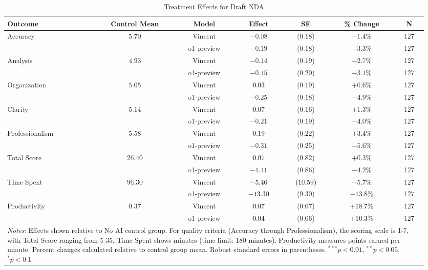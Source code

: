 \begin{table}[!htbp]
\centering
\caption{Treatment Effects for Draft NDA}
\label{tab:task4_effects}
\begin{tabular}{lcccccc}
\hline\hline
Outcome & Control Mean & Model & Effect & SE & \% Change & N \\
\hline
\multirow{2}{*}{Accuracy} & \multirow{2}{*}{$5.70$} & Vincent & $-0.08$ & ($0.18$) & $-1.4\%$ & 127 \\
& & o1-preview & $-0.19$ & ($0.18$) & $-3.3\%$ & 127 \\
\hline
\multirow{2}{*}{Analysis} & \multirow{2}{*}{$4.93$} & Vincent & $-0.14$ & ($0.19$) & $-2.7\%$ & 127 \\
& & o1-preview & $-0.15$ & ($0.20$) & $-3.1\%$ & 127 \\
\hline
\multirow{2}{*}{Organization} & \multirow{2}{*}{$5.05$} & Vincent & $0.03$ & ($0.19$) & $+0.6\%$ & 127 \\
& & o1-preview & $-0.25$ & ($0.18$) & $-4.9\%$ & 127 \\
\hline
\multirow{2}{*}{Clarity} & \multirow{2}{*}{$5.14$} & Vincent & $0.07$ & ($0.16$) & $+1.3\%$ & 127 \\
& & o1-preview & $-0.21$ & ($0.19$) & $-4.0\%$ & 127 \\
\hline
\multirow{2}{*}{Professionalism} & \multirow{2}{*}{$5.58$} & Vincent & $0.19$ & ($0.22$) & $+3.4\%$ & 127 \\
& & o1-preview & $-0.31$ & ($0.25$) & $-5.6\%$ & 127 \\
\hline
\multirow{2}{*}{Total Score} & \multirow{2}{*}{$26.40$} & Vincent & $0.07$ & ($0.82$) & $+0.3\%$ & 127 \\
& & o1-preview & $-1.11$ & ($0.86$) & $-4.2\%$ & 127 \\
\hline
\multirow{2}{*}{Time Spent} & \multirow{2}{*}{$96.30$} & Vincent & $-5.46$ & ($10.59$) & $-5.7\%$ & 127 \\
& & o1-preview & $-13.30$ & ($9.30$) & $-13.8\%$ & 127 \\
\hline
\multirow{2}{*}{Productivity} & \multirow{2}{*}{$0.37$} & Vincent & $0.07$ & ($0.07$) & $+18.7\%$ & 127 \\
& & o1-preview & $0.04$ & ($0.06$) & $+10.3\%$ & 127 \\
\hline
\multicolumn{7}{p{0.95\linewidth}}{\footnotesize \textit{Notes:} Effects shown relative to No AI control group. For quality criteria (Accuracy through Professionalism), the scoring scale is 1-7, with Total Score ranging from 5-35. Time Spent shows minutes (time limit: 180 minutes). Productivity measures points earned per minute. Percent changes calculated relative to control group mean. Robust standard errors in parentheses. $^{***}p<0.01$, $^{**}p<0.05$, $^{*}p<0.1$}
\end{tabular}
\end{table}
